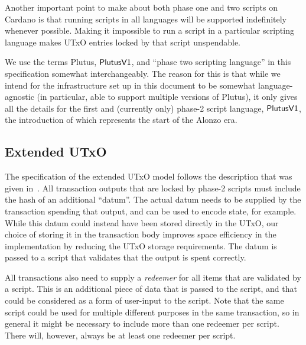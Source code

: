Another important point to make about both phase one and two scripts on Cardano is that
running scripts in all languages will be supported indefinitely whenever possible.
Making it impossible to run a script in a particular scripting language
makes UTxO entries locked by that script unspendable.

We use the terms Plutus, $\mathsf{PlutusV1}$, and ``phase two scripting language'' in this specification
somewhat interchangeably. The reason for this is that while we intend for the infrastructure
set up in this document to be somewhat language-agnostic (in particular,
able to support multiple versions of Plutus), it only gives all the details for
the first and (currently only) phase-2 script language, $\mathsf{PlutusV1}$,
the introduction of which represents the
start of the Alonzo era.


\subsection{Extended UTxO}

The specification of the extended UTxO model follows the description that was given in~\cite{chakravarty2020extended}.
All transaction outputs that are locked by phase-2 scripts must include the hash of an additional ``datum''. The actual datum needs to be supplied by the transaction spending that output, and can be used to encode state, for example.
While this datum could instead have been stored directly in the UTxO, our choice of storing it in the transaction body improves space efficiency in the implementation by reducing the UTxO storage requirements. The datum is passed to a script that validates that the output is spent correctly.

All transactions also need to supply a \emph{redeemer} for all items that are validated by a script. This is an additional piece of data that is passed to the script, and that could be considered as a form of user-input to the script. Note that the same script could be used for multiple different purposes in the same transaction, so in general it might be necessary to include more than one redeemer per script.
There will, however, always be at least one redeemer per script.
